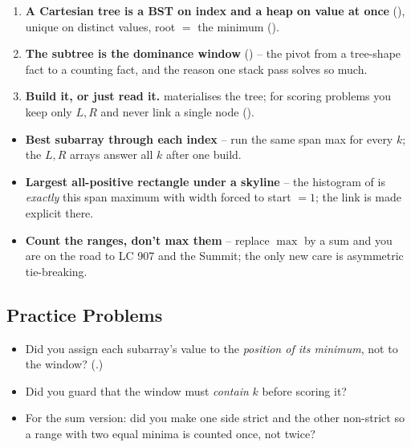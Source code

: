 \begin{insightbox}
\begin{enumerate}[nosep, leftmargin=1.6em]
  \item \textbf{A Cartesian tree is a BST on index and a heap on value at once} (),
        unique on distinct values, root $=$ the minimum ().
  \item \textbf{The subtree is the dominance window} () -- the pivot from a tree-shape
        fact to a counting fact, and the reason one stack pass solves so much.
  \item \textbf{Build it, or just read it.}  materialises the tree; for scoring
        problems you keep only $L,R$ and never link a single node ().
\end{enumerate}
\end{insightbox}

\begin{hardeningbox}
\begin{itemize}[nosep, leftmargin=1.4em]
  \item \textbf{Best subarray through each index} -- run the same span max for every $k$; the $L,R$
        arrays answer all $k$ after one build.
  \item \textbf{Largest all-positive rectangle under a skyline} -- the histogram of
         is \emph{exactly} this span maximum with width forced to start $=1$; the
        link is made explicit there.
  \item \textbf{Count the ranges, don't max them} -- replace $\max$ by a sum and you are on the road to
        LC 907 and the Summit; the only new care is asymmetric tie-breaking.
\end{itemize}
\end{hardeningbox}

\subsection{Practice Problems}

\begin{stuckbox}
\begin{itemize}[nosep, leftmargin=1.4em]
  \item Did you assign each subarray's value to the \emph{position of its minimum}, not to the window?
        (.)
  \item Did you guard that the window must \emph{contain} $k$ before scoring it?
  \item For the sum version: did you make one side strict and the other non-strict so a range with two
        equal minima is counted once, not twice?
\end{itemize}
\end{stuckbox}

